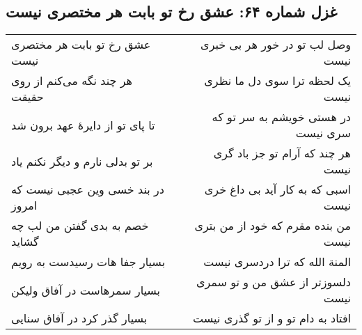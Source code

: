 \begin{center}
\section*{غزل شماره ۶۴: عشق رخ تو بابت هر مختصری نیست}
\label{sec:064}
\begin{longtable}{l p{0.5cm} r}
عشق رخ تو بابت هر مختصری نیست
&&
وصل لب تو در خور هر بی خبری نیست
\\
هر چند نگه می‌کنم از روی حقیقت
&&
یک لحظه ترا سوی دل ما نظری نیست
\\
تا پای تو از دایرهٔ عهد برون شد
&&
در هستی خویشم به سر تو که سری نیست
\\
بر تو بدلی نارم و دیگر نکنم یاد
&&
هر چند که آرام تو جز باد گری نیست
\\
در بند خسی وین عجبی نیست که امروز
&&
اسبی که به کار آید بی داغ خری نیست
\\
خصم به بدی گفتن من لب چه گشاید
&&
من بنده مقرم که خود از من بتری نیست
\\
بسیار جفا هات رسیدست به رویم
&&
المنة الله که ترا دردسری نیست
\\
بسیار سمرهاست در آفاق ولیکن
&&
دلسوزتر از عشق من و تو سمری نیست
\\
بسیار گذر کرد در آفاق سنایی
&&
افتاد به دام تو و از تو گذری نیست
\\
\end{longtable}
\end{center}
